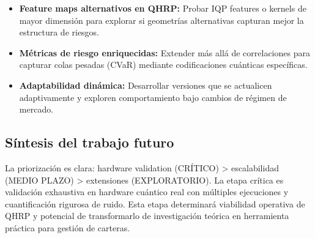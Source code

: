 \begin{itemize}
	\item \textbf{Feature maps alternativos en QHRP:} Probar IQP features o kernels de mayor dimensión para explorar si geometrías alternativas capturan mejor la estructura de riesgos.
	\item \textbf{Métricas de riesgo enriquecidas:} Extender más allá de correlaciones para capturar colas pesadas (CVaR) mediante codificaciones cuánticas específicas.
	\item \textbf{Adaptabilidad dinámica:} Desarrollar versiones que se actualicen adaptivamente y exploren comportamiento bajo cambios de régimen de mercado.
\end{itemize}

\subsection{Síntesis del trabajo futuro}
La priorización es clara: hardware validation (CRÍTICO) > escalabilidad (MEDIO PLAZO) > extensiones (EXPLORATORIO). La etapa crítica es validación exhaustiva en hardware cuántico real con múltiples ejecuciones y cuantificación rigurosa de ruido. Esta etapa determinará viabilidad operativa de QHRP y potencial de transformarlo de investigación teórica en herramienta práctica para gestión de carteras.




